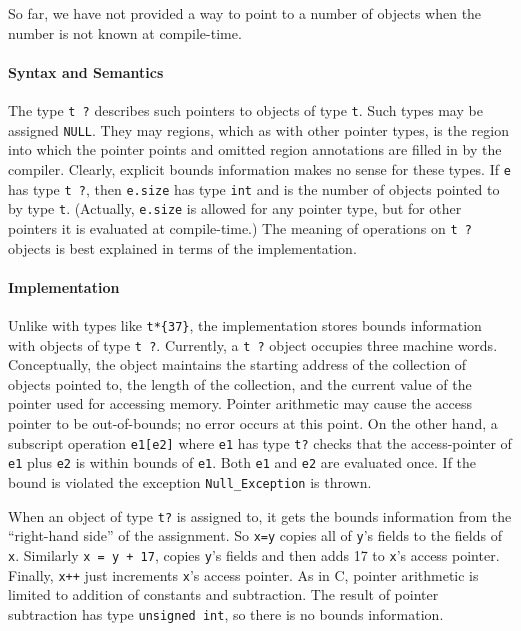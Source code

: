 So far, we have not provided a way to point to a number of objects
when the number is not known at compile-time.


\paragraph{Syntax and Semantics} The type \texttt{t ?} describes such pointers
to objects of type \texttt{t}.  Such types may be assigned
\texttt{NULL}.  They may regions, which as with other
pointer types, is the region into which the pointer points and omitted
region annotations are filled in by the compiler.  Clearly,
explicit bounds information makes no sense for these types.  If
\texttt{e} has type \texttt{t ?}, then
\texttt{e.size} has type \texttt{int} and is the number of objects pointed
to by type \texttt{t}.  (Actually, \texttt{e.size} is allowed for any
pointer type, but for other pointers it is evaluated at compile-time.)
The meaning of operations on \texttt{t ?} objects is best explained in
terms of the implementation.

\paragraph{Implementation} Unlike with types like \verb|t*{37}|,
the implementation stores bounds information with objects of type
\texttt{t ?}.  Currently, a \texttt{t ?} object occupies three machine
words.  Conceptually, the object maintains the starting address of the
collection of objects pointed to, the length of the collection, and
the current value of the pointer used for accessing memory.  Pointer
arithmetic may cause the access pointer to be out-of-bounds; no error
occurs at this point.  On the other hand, a subscript operation
\texttt{e1[e2]} where \texttt{e1} has type \texttt{t?} checks that the
access-pointer of \texttt{e1} plus \texttt{e2} is within bounds of
\texttt{e1}.  Both \texttt{e1} and \texttt{e2} are evaluated once.  If the
bound is violated the exception \texttt{Null_Exception} is thrown.

When an object of type \texttt{t?} is assigned to, it gets the bounds
information from the ``right-hand side'' of the assignment.  So
\texttt{x=y} copies all of \texttt{y}'s fields to the fields of \texttt{x}.
Similarly \texttt{x = y + 17}, copies \texttt{y}'s fields and then adds 17
to \texttt{x}'s access pointer.  Finally, \texttt{x++} just increments
\texttt{x}'s access pointer.  As in C, pointer arithmetic is limited to
addition of constants and subtraction.  The result of pointer
subtraction has type \texttt{unsigned int}, so there is no bounds
information.

